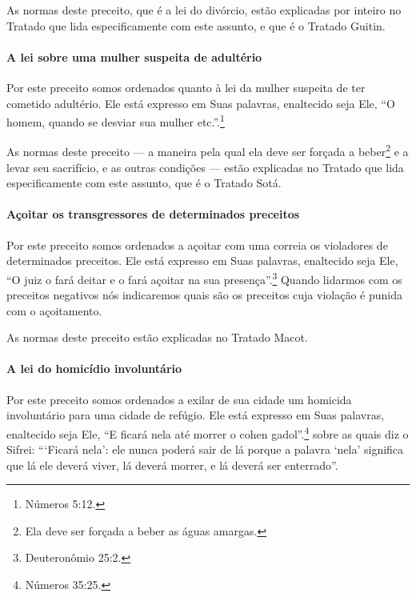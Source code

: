 \begin{multicols}{2}
As normas deste preceito, que é a lei do divórcio, estão explicadas por
inteiro no Tratado que lida especificamente com este assunto, e que é o
Tratado Guitin\starr.

\paragraph{A lei sobre uma mulher suspeita de adultério}

Por este preceito somos ordenados quanto à lei da mulher suspeita de ter
cometido adultério. Ele está expresso em Suas palavras, enaltecido seja Ele,
``O homem, quando se desviar sua mulher etc.''.\footnote{Números 5:12.}

As normas deste preceito --- a maneira pela qual ela deve ser forçada a
beber\footnote{Ela deve ser forçada a beber as águas amargas.} e a levar seu sacrifício, e as outras
condições --- estão explicadas no Tratado que lida especificamente com
este assunto, que é o Tratado Sotá\starr.

\paragraph{Açoitar os transgressores de determinados preceitos}

Por este preceito somos ordenados a açoitar com uma correia os
violadores de determinados preceitos. Ele está expresso em Suas
palavras, enaltecido seja Ele, ``O juiz o fará deitar e o fará açoitar
na sua presença''.\footnote{Deuteronômio 25:2.} Quando lidarmos com os preceitos
negativos nós indicaremos quais são os preceitos cuja violação é punida
com o açoitamento.

As normas deste preceito estão explicadas no Tratado Macot\starr.

\paragraph{A lei do homicídio involuntário}

Por este preceito somos ordenados a exilar de sua cidade um homicida
involuntário para uma cidade de refúgio. Ele está expresso em Suas
palavras, enaltecido seja Ele, ``E ficará nela até morrer o cohen
gadol\starr{}''.\footnote{Números 35:25.} sobre as quais diz o Sifrei\starr: ```Ficará nela':
ele nunca poderá sair de lá porque a palavra `nela' significa que lá ele
deverá viver, lá deverá morrer, e lá deverá ser enterrado''.


\end{multicols}
